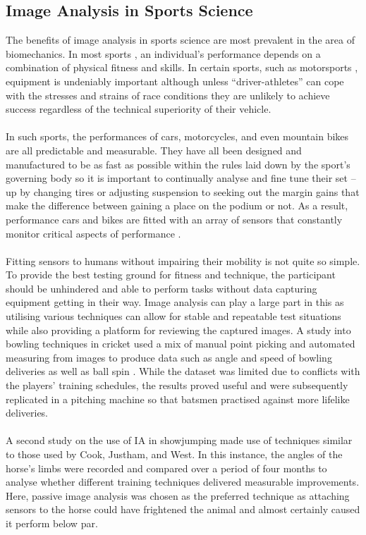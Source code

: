 \subsection{Image Analysis in Sports Science}
	The benefits of image analysis in sports science are most prevalent in the area of biomechanics. In most sports , an individual’s performance depends on a combination of physical fitness and skills. In certain sports, such as motorsports , equipment is undeniably important although unless “driver-athletes” can cope with the stresses and strains of race conditions they are unlikely to achieve success regardless of the technical superiority of their vehicle.
	\\\\
	In such sports, the performances of cars, motorcycles, and even mountain bikes are all predictable and measurable. They have all been designed and manufactured to be as fast as possible within the rules laid down by the sport’s governing body so it is important to continually analyse and fine tune their set – up by changing tires or adjusting suspension to seeking out the margin gains that make the difference between gaining a place on the podium or not. As a result, performance cars and bikes are fitted with an array of sensors that constantly monitor critical aspects of performance . 
	\\\\
	Fitting sensors to humans without impairing their mobility is not quite so simple. To provide the best testing ground for fitness and technique, the participant should be unhindered and able to perform tasks without data capturing equipment getting in their way. Image analysis can play a large part in this as utilising various techniques can allow for stable and repeatable test situations while also providing a platform for reviewing the captured images. A study into bowling techniques in cricket used a mix of manual point picking and automated measuring from images to produce data such as angle and speed of bowling deliveries as well as ball spin \citep{cricketimaging}. While the dataset was limited due to conflicts with the players’ training schedules, the results proved useful and were subsequently replicated in a pitching machine so that batsmen practised against more lifelike deliveries.
	\\\\
	A second study on the use of IA in showjumping \citep{jumpyhorses} made use of techniques similar to those used by Cook, Justham, and West. In this instance, the angles of the horse’s limbs were recorded and compared over a period of four months to analyse whether different training techniques delivered measurable improvements. Here, passive image analysis was chosen as the preferred technique as attaching sensors to the horse could have frightened the animal and almost certainly caused it perform below par.